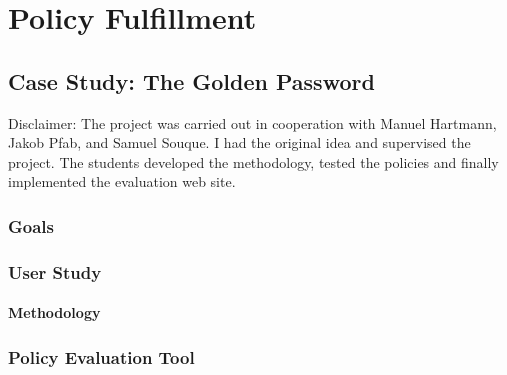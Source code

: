 \chapter[Policy Fulfillment]{Policy Fulfillment}\label{chap:psst_policy_fulfillment}


\section{Case Study: The Golden Password}
Disclaimer:
The project was carried out in cooperation with Manuel Hartmann, Jakob Pfab, and Samuel Souque. I had the original idea and supervised the project. The students developed the methodology, tested the policies and finally implemented the evaluation web site. 
\subsection{Goals}
\subsection{User Study}
\subsubsection{Methodology}
\subsection{Policy Evaluation Tool}
